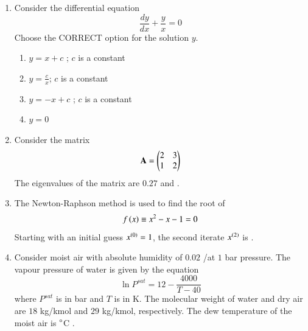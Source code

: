 \documentclass[journal,12pt,onecolumn]{IEEEtran}
\theoremstyle{remark}
\begin{document}
\begin{enumerate}
		\item Consider the differential equation
		\[ \frac{dy}{dx} + \frac{y}{x} = 0 \]
		Choose the CORRECT option for the solution $y$.
		
		\hfill{}
		
		\begin{enumerate}
			\item $y = x + c$ ; $c$ is a constant
			\item $y = \frac{c}{x}$; $c$ is a constant
			\item $y = -x + c$ ; $c$ is a constant
			\item $y = 0$
		\end{enumerate}
		
		\item Consider the matrix
		\[ \mathbf{A} = \begin{pmatrix}2 & 3 \\ 1 & 2\end{pmatrix} \]
		The eigenvalues of the matrix are $0.27$ and \underline{\hspace{2cm}} .
		
		\hfill{}
		
		\item The Newton-Raphson method is used to find the root of
		\[ f\left(x\right) \equiv x^2 - x - 1 = 0 \]
		Starting with an initial guess $x^{\left(0\right)} = 1$, the second iterate $x^{\left(2\right)}$ is \underline{\hspace{2cm}} .
		
		\hfill{}
		
		\item Consider moist air with absolute humidity of $0.02$ /at $1$ bar pressure. The vapour pressure of water is given by the equation
		\[ \ln P^{sat} = 12 - \frac{4000}{T - 40} \]
		where $P^{sat}$ is in bar and $T$ is in K. The molecular weight of water and dry air are $18$ kg/kmol and $29$ kg/kmol, respectively. The dew temperature of the moist air is \underline{\hspace{2cm}} $\degree$C .
		
		\hfill{}
		

\end{enumerate}
\end{document}
